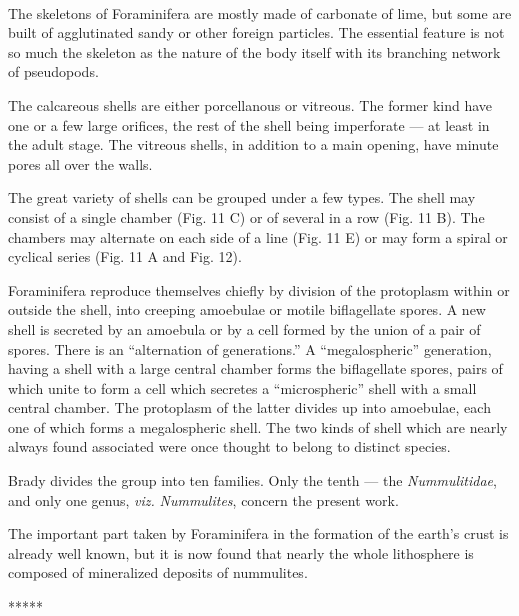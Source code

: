 \documentclass[a4paper, 12pt, oneside, landscape]{article}
\begin{document}
\paragraph{}
The skeletons of Foraminifera are mostly made of carbonate of lime, but some are built of agglutinated sandy or other foreign particles. The essential feature is not so much the skeleton as the nature of the body itself with its branching network of pseudopods.

The calcareous shells are either porcellanous or vitreous. The former kind have one or a few large orifices, the rest of the shell being imperforate --- at least in the adult stage. The vitreous shells, in addition to a main opening, have minute pores all over the walls.

The great variety of shells can be grouped under a few types. The shell may consist of a single chamber (Fig. 11 C) or of several in a row (Fig. 11 B). The chambers may alternate on each side of a line (Fig. 11 E) or may form a spiral or cyclical series (Fig. 11 A and Fig. 12).

Foraminifera reproduce themselves chiefly by division of the protoplasm within or outside the shell, into creeping amoebulae or motile biflagellate spores. A new shell is secreted by an amoebula or by a cell formed by the union of a pair of spores. There is an ``alternation of generations.'' A ``megalospheric'' generation, having a shell with a large central chamber forms the biflagellate spores, pairs of which unite to form a cell which secretes a ``microspheric'' shell with a small central chamber. The protoplasm of the latter divides up into amoebulae, each one of which forms a megalospheric shell. The two kinds of shell which are nearly always found associated were once thought to belong to distinct species.

Brady divides the group into ten families. Only the tenth --- the \emph{Nummulitidae}, and only one genus, \emph{viz.} \emph{Nummulites}, concern the present work.

The important part taken by Foraminifera in the formation of the earth's crust is already well known, but it is now found that nearly the whole lithosphere is composed of mineralized deposits of nummulites.

\centerline{*\hspace{15mm}*\hspace{15mm}*\hspace{15mm}*\hspace{15mm}*}
\bigskip
\end{document}
